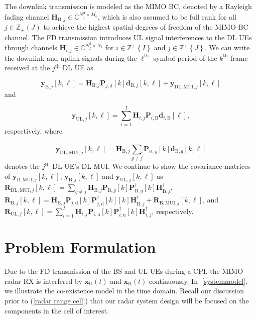 \documentclass[conference]{IEEEtran}
\newcommand{\bracket}[1]{{\left [{#1}\right ]}}
\newcommand{\braces}[1]{{\left\{ {#1}\right\}}}
\newcommand{\ith}[1]    {{#1}^{\underline{\text{th}}}}
\newcommand{\B}{\mathrm{B}}
\newcommand{\PiB}{\mathbf{P}_{i,\textrm{u}}\bracket{k}}
\newcommand{\PiBH}{\mathbf{P}^\dagger_{i,\textrm{u}}\bracket{k}}
\newcommand{\PBj}{\mathbf{P}_{j,\textrm{d}}\bracket{k}}
\newcommand{\PBjH}{\mathbf{P}^\dagger_{j,\textrm{d}}\bracket{k}}
\begin{document}
The downlink transmission is modeled as the MIMO BC, denoted by a Rayleigh fading channel $\mathbf{H}_{\mathrm{B},j}\in\mathbb{C}^{N^{\text{d}}_j\times M_\mathrm{c}}$, which is also assumed to be full rank for all $j\in\mathbb{Z}_{+}(J)$ to achieve the highest spatial degrees of freedom of the MIMO-BC channel\cite{MIMOcom}. The FD transmission introduces UL signal interferences to the DL UEs through channels $\mathbf{H}_{i,j}\in\mathbb{C}^{N^{\text{d}}_j\times N_i}$ for $i\in\mathbb{Z}^+\braces{I}$ and $j\in\mathbb{Z}^+\braces{J}$. We can write the downlink and uplink signals during the $\ith{\ell}$ symbol period of the $\ith{k}$ frame received at the $\ith{j}$ DL UE as \par\noindent\small
	\begin{equation} \label{MUI}
	\mathbf{y}_{\mathrm{B},j}\bracket{k,\ell}=\mathbf{H}_{\mathrm{B},j} \PBj\mathbf{d}_{\mathrm{B},j}\bracket{k,\ell}+\mathbf{y}_{\mathrm{DL,MUI},j}\bracket{k,\ell}
	\end{equation}\normalsize
	and\par\noindent\small
	\begin{equation}
	\mathbf{y}_{\mathrm{UL},j}\bracket{k,\ell}=\sum_{i=1}^{I}\mathbf{H}_{i,j}\mathbf{P}_{i,\mathrm{B}}\mathbf{d}_{i,\mathrm{B}}\bracket{\ell},
	\end{equation}\normalsize
	respectively, where\par\noindent\small
	\begin{equation}
	\mathbf{y}_{\mathrm{DL,MUI},j}\bracket{k,\ell} = \mathbf{H}_{\mathrm{B},j}\sum_{g\neq j}^{}\mathbf{P}_{\mathrm{B},g}\bracket{k}\mathbf{d}_{\mathrm{B},g}\bracket{k,\ell}\nonumber
	\end{equation}\normalsize
	denotes the $\ith{j}$ DL UE's DL MUI. We continue to show the covariance matrices of $\mathbf{y}_{\mathrm{B,MUI},j}\bracket{k,\ell}$, $\mathbf{y}_{\mathrm{B},j}\bracket{k,\ell}$ and $\mathbf{y}_{\mathrm{UL},j}\bracket{k,\ell}$ as $\mathbf{R}_{\mathrm{DL,MUI},j}\bracket{k,\ell}=\sum_{g\neq j}\mathbf{H}_{\mathrm{B},j}\mathbf{P}_{\mathrm{B},g}\bracket{k}\mathbf{P}^{\dagger}_{\mathrm{B},g}\bracket{k}\mathbf{H}^\dagger_{\mathrm{B},j}$, $\mathbf{R}_{\B,j}\bracket{k,\ell}=\mathbf{H}_{\mathrm{B},j}\PBj\PBjH\bracket{k}\mathbf{H}^\dagger_{\mathrm{B},j}+\mathbf{R}_{\mathrm{B,MUI},j}\bracket{k,\ell}$, and $\mathbf{R}_{\mathrm{UL},j}\bracket{k,\ell}=\sum_{i=1}^{I}\mathbf{H}_{i,j}\PiB\PiBH\mathbf{H}^\dagger_{i,j}$, respectively.
\section{Problem Formulation}
\label{sec:problem formulation}
Due to the FD transmission of the BS and UL UEs during a CPI, the MIMO radar RX is interfered by $\mathbf{x}_{\mathrm{U}}(t)$ and $\mathbf{x}_{\mathrm{B}}(t)$ continuously. In \figurename{$\;$\ref{systemmodel}}, we illustrate the co-existence model in the time domain. Recall our discussion prior to (\ref{radar range cell}) that our radar system design will be focused on the components in the cell of interest. 
	
\end{document}
